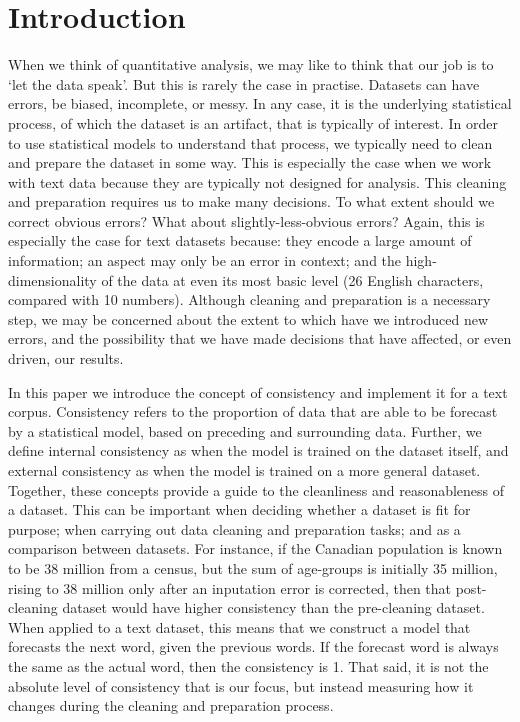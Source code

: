 \documentclass[11pt,]{article}
\begin{document}
\vskip -8.5pt



\noindent  

\hypertarget{introduction}{%
\section{Introduction}\label{introduction}}

When we think of quantitative analysis, we may like to think that our job is to `let the data speak'. But this is rarely the case in practise. Datasets can have errors, be biased, incomplete, or messy. In any case, it is the underlying statistical process, of which the dataset is an artifact, that is typically of interest. In order to use statistical models to understand that process, we typically need to clean and prepare the dataset in some way. This is especially the case when we work with text data because they are typically not designed for analysis. This cleaning and preparation requires us to make many decisions. To what extent should we correct obvious errors? What about slightly-less-obvious errors? Again, this is especially the case for text datasets because: they encode a large amount of information; an aspect may only be an error in context; and the high-dimensionality of the data at even its most basic level (26 English characters, compared with 10 numbers). Although cleaning and preparation is a necessary step, we may be concerned about the extent to which have we introduced new errors, and the possibility that we have made decisions that have affected, or even driven, our results.

In this paper we introduce the concept of consistency and implement it for a text corpus. Consistency refers to the proportion of data that are able to be forecast by a statistical model, based on preceding and surrounding data. Further, we define internal consistency as when the model is trained on the dataset itself, and external consistency as when the model is trained on a more general dataset. Together, these concepts provide a guide to the cleanliness and reasonableness of a dataset. This can be important when deciding whether a dataset is fit for purpose; when carrying out data cleaning and preparation tasks; and as a comparison between datasets. For instance, if the Canadian population is known to be 38 million from a census, but the sum of age-groups is initially 35 million, rising to 38 million only after an inputation error is corrected, then that post-cleaning dataset would have higher consistency than the pre-cleaning dataset. When applied to a text dataset, this means that we construct a model that forecasts the next word, given the previous words. If the forecast word is always the same as the actual word, then the consistency is 1. That said, it is not the absolute level of consistency that is our focus, but instead measuring how it changes during the cleaning and preparation process.
\end{document}
